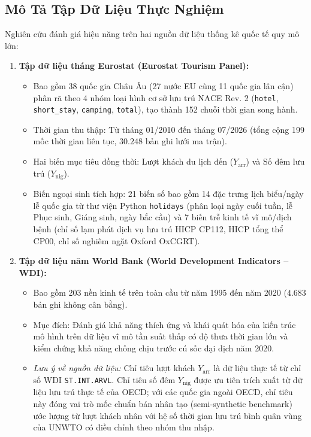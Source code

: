 \subsection{Mô Tả Tập Dữ Liệu Thực Nghiệm}
Nghiên cứu đánh giá hiệu năng trên hai nguồn dữ liệu thống kê quốc tế quy mô lớn:
\begin{enumerate}
    \item \textbf{Tập dữ liệu tháng Eurostat (Eurostat Tourism Panel):}
    \begin{itemize}
        \item Bao gồm 38 quốc gia Châu Âu (27 nước EU cùng 11 quốc gia lân cận) phân rã theo 4 nhóm loại hình cơ sở lưu trú NACE Rev. 2 (\texttt{hotel}, \texttt{short\_stay}, \texttt{camping}, \texttt{total}), tạo thành 152 chuỗi thời gian song hành.
        \item Thời gian thu thập: Từ tháng 01/2010 đến tháng 07/2026 (tổng cộng 199 mốc thời gian liên tục, $30.248$ bản ghi lưới ma trận).
        \item Hai biến mục tiêu đồng thời: Lượt khách du lịch đến ($Y_{\text{arr}}$) và Số đêm lưu trú ($Y_{\text{nig}}$).
        \item Biến ngoại sinh tích hợp: 21 biến số bao gồm 14 đặc trưng lịch biểu/ngày lễ quốc gia từ thư viện Python \texttt{holidays} (phân loại ngày cuối tuần, lễ Phục sinh, Giáng sinh, ngày bắc cầu) và 7 biến trễ kinh tế vĩ mô/dịch bệnh (chỉ số lạm phát dịch vụ lưu trú HICP CP112, HICP tổng thể CP00, chỉ số nghiêm ngặt Oxford OxCGRT).
    \end{itemize}
    \item \textbf{Tập dữ liệu năm World Bank (World Development Indicators -- WDI):}
    \begin{itemize}
        \item Bao gồm 203 nền kinh tế trên toàn cầu từ năm 1995 đến năm 2020 ($4.683$ bản ghi không cân bằng).
        \item Mục đích: Đánh giá khả năng thích ứng và khái quát hóa của kiến trúc mô hình trên dữ liệu vĩ mô tần suất thấp có độ thưa thời gian lớn và kiểm chứng khả năng chống chịu trước cú sốc đại dịch năm 2020.
        \item \textit{Lưu ý về nguồn dữ liệu:} Chỉ tiêu lượt khách $Y_{\text{arr}}$ là dữ liệu thực tế từ chỉ số WDI \texttt{ST.INT.ARVL}. Chỉ tiêu số đêm $Y_{\text{nig}}$ được ưu tiên trích xuất từ dữ liệu lưu trú thực tế của OECD; với các quốc gia ngoài OECD, chỉ tiêu này đóng vai trò mốc chuẩn bán nhân tạo (semi-synthetic benchmark) ước lượng từ lượt khách nhân với hệ số thời gian lưu trú bình quân vùng của UNWTO có điều chỉnh theo nhóm thu nhập.
    \end{itemize}
\end{enumerate}

